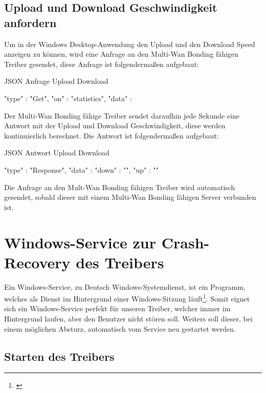 \subsection{Upload und Download Geschwindigkeit anfordern}
Um in der Windows Desktop-Anwendung den Upload und den Download Speed anzeigen zu können, wird eine Anfrage an den Multi-Wan Bonding fähigen Treiber gesendet, diese Anfrage ist folgendermaßen aufgebaut:
\begin{program}[H]
\caption{JSON Anfrage Upload Download}
\begin{GenericCode}
    {
        "type" :  "Get",
        "on" :  "statistics",
        "data" : {} 
    }     
\end{GenericCode}
\end{program}
\noindent
Der Multi-Wan Bonding fähige Treiber sendet daraufhin jede Sekunde eine Antwort mit der Upload und Download Geschwindigkeit, diese werden kontinuierlich berechnet. Die Antwort ist folgendermaßen aufgebaut:
\begin{program}[H]
\caption{JSON Antwort Upload Download}
\begin{GenericCode}
    {
        "type" :  "Response",
        "data" : {
                    "down" : "",
                    "up" : ""
        } 
    }    
\end{GenericCode}
\end{program}
\noindent
Die Anfrage an den Mult-Wan Bonding fähigen Treiber wird automatisch gesendet, sobald dieser mit einem Multi-Wan Bonding fähigen Server verbunden ist. 

\lstset{basicstyle=\normalsize}

\pagebreak

\section{Windows-Service zur Crash-Recovery des Treibers}

Ein Windows-Service, zu Deutsch Windows-Systemdienst, ist ein Programm, welches als Dienst im Hintergrund einer Windows-Sitzung läuft\footnote[1]{\cite[Vgl.][]{WindowsService}}. Somit eignet sich ein Windows-Service perfekt für unseren Treiber, welcher immer im Hintergrund laufen, aber den Benutzer nicht stören soll. Weiters soll dieser, bei einem möglichen Absturz, automatisch vom Service neu gestartet werden.

\subsection{Starten des Treibers}

